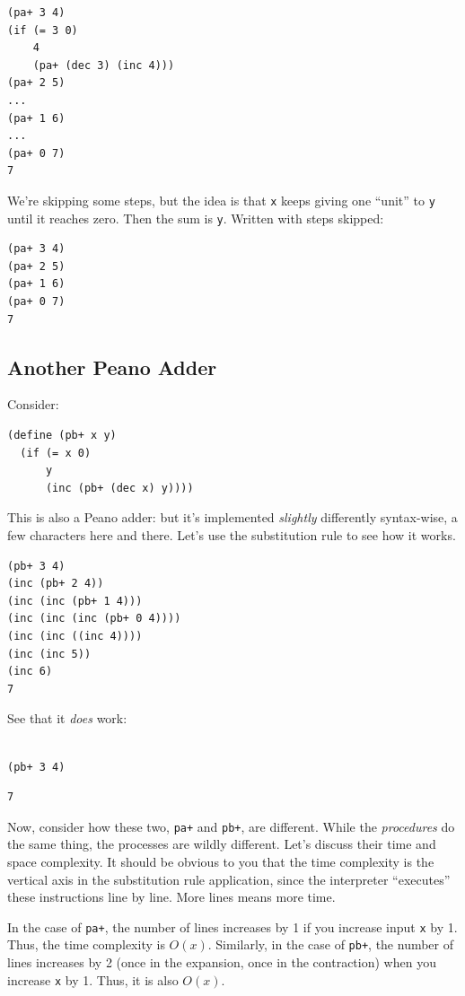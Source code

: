 \documentclass[9pt]{report}
\begin{document}
\begin{verbatim}
(pa+ 3 4)
(if (= 3 0)
    4
    (pa+ (dec 3) (inc 4)))
(pa+ 2 5)
...
(pa+ 1 6)
...
(pa+ 0 7)
7
\end{verbatim}

We're skipping some steps, but the idea is that \texttt{x} keeps giving
one ``unit'' to \texttt{y} until it reaches zero. Then the sum is \texttt{y}.
Written with steps skipped:

\begin{verbatim}
(pa+ 3 4)
(pa+ 2 5)
(pa+ 1 6)
(pa+ 0 7)
7
\end{verbatim}

\subsection{Another Peano Adder}
\label{sec:org444a353}
Consider:
\begin{verbatim}
(define (pb+ x y)
  (if (= x 0)
      y
      (inc (pb+ (dec x) y))))
\end{verbatim}


This is also a Peano adder: but it's implemented \emph{slightly}
differently syntax-wise, a few characters here and there. Let's
use the substitution rule to see how it works.

\begin{verbatim}
(pb+ 3 4)
(inc (pb+ 2 4))
(inc (inc (pb+ 1 4)))
(inc (inc (inc (pb+ 0 4))))
(inc (inc ((inc 4))))
(inc (inc 5))
(inc 6)
7
\end{verbatim}

See that it \emph{does} work:

\begin{verbatim}

(pb+ 3 4)
\end{verbatim}

\begin{verbatim}
7
\end{verbatim}


Now, consider how these two, \texttt{pa+} and \texttt{pb+}, are different. While
the \emph{procedures} do the same thing, the processes are wildly
different. Let's discuss their time and space complexity.
It should be obvious to you that the time complexity is the
vertical axis in the substitution rule application, since the
interpreter ``executes'' these instructions line by line. More lines
means more time.

In the case of \texttt{pa+}, the number of lines increases by 1 if you
increase input \texttt{x} by 1. Thus, the time complexity is \(O(x)\).
Similarly, in the case of \texttt{pb+}, the number of lines increases by
2 (once in the expansion, once in the contraction) when you
increase \texttt{x} by 1. Thus, it is also \(O(x)\).
\end{document}
